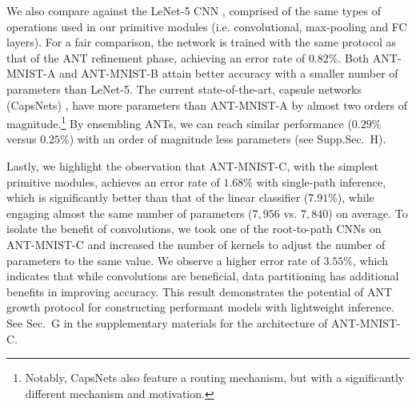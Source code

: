 We also compare against the LeNet-5 CNN \cite{lecun1998gradient}, comprised of the same types of operations used in our primitive modules (i.e. convolutional, max-pooling and FC layers). For a fair comparison, the network is trained with the same protocol as that of the ANT refinement phase, achieving an error rate of $0.82\%$. Both ANT-MNIST-A and ANT-MNIST-B attain better accuracy with a smaller number of parameters than LeNet-5. The current state-of-the-art, capsule networks (CapsNets) \cite{sabour2017dynamic}, have more parameters than ANT-MNIST-A by almost two orders of magnitude.\footnote{Notably, CapsNets also feature a routing mechanism, but with a significantly different mechanism and motivation.} By ensembling ANTs, we can reach similar performance ($0.29\%$ versus $0.25\%$) with an order of magnitude less parameters (see Supp.Sec.~H).

Lastly, we highlight the observation that ANT-MNIST-C, with the simplest primitive modules, achieves an error rate of $1.68\%$ with single-path inference, which is significantly better than that of the linear classifier ($7.91\%$), while engaging almost the same number of parameters ($7,956$ vs. $7,840$) on average. To isolate the benefit of convolutions, we took one of the root-to-path CNNs on ANT-MNIST-C and increased the number of kernels to adjust the number of parameters to the same value. We observe a higher error rate of $3.55\%$, which indicates that while convolutions are beneficial, data partitioning has additional benefits in improving accuracy. This result demonstrates the potential of ANT growth protocol for constructing performant models with lightweight inference. See Sec.~G in the supplementary materials for the architecture of ANT-MNIST-C.

